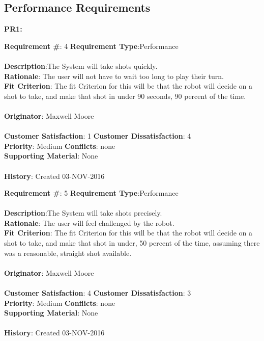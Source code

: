 \documentclass[titlepage]{article}
\begin{document}
 
 \subsection{Performance Requirements}
 \textbf{PR1:} %
 
\begin{framed}
	\noindent\textbf{Requirement \#}: 4 \hfill \textbf{Requirement Type}:Performance \hfill\\\\
	\noindent\textbf{Description}:The System will take shots quickly.\\
	\textbf{Rationale}: The user will not have to wait too long to play their turn.\\
	\textbf{Fit Criterion}: The fit Criterion for this will be that the robot will decide on a shot to take, and make that shot in under 90 seconds, 90 percent of the time.\\\\
	\textbf{Originator}: Maxwell Moore\\\\
	\noindent\textbf{Customer Satisfaction}: 1 \hfill 	\textbf{Customer Dissatisfaction}: 4 \hfill\\
	\textbf{Priority}: Medium \hfill \textbf{Conflicts}: none \hfill\\
	\textbf{Supporting Material}: None\\\\
	\noindent\textbf{History}: Created 03-NOV-2016
\end{framed}

\begin{framed}
	\noindent\textbf{Requirement \#}: 5 \hfill \textbf{Requirement Type}:Performance \hfill\\\\
	\noindent\textbf{Description}:The System will take shots precisely.\\
	\textbf{Rationale}: The user will feel challenged by the robot.\\
	\textbf{Fit Criterion}: The fit Criterion for this will be that the robot will decide on a shot to take, and make that shot in under, 50 percent of the time, assuming there was a reasonable, straight shot available.\\\\
	\textbf{Originator}: Maxwell Moore\\\\
	\noindent\textbf{Customer Satisfaction}: 4 \hfill 	\textbf{Customer Dissatisfaction}: 3 \hfill\\
	\textbf{Priority}: Medium \hfill \textbf{Conflicts}: none \hfill\\
	\textbf{Supporting Material}: None\\\\
	\noindent\textbf{History}: Created 03-NOV-2016
\end{framed}
\end{document}
